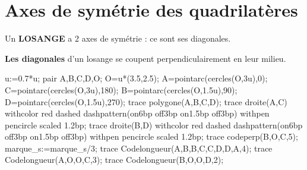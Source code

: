 \section{Axes de symétrie des quadrilatères}
\begin{minipage}{0.75\linewidth}
    \begin{propriete}[\admise]
        Un \textbf{LOSANGE} a 2 axes de symétrie : ce sont ses diagonales.
    \end{propriete}
    \begin{remarque}

        \textbf{Les diagonales} d'un losange se coupent perpendiculairement en leur milieu.
    \end{remarque}
\end{minipage}
\begin{minipage}{0.2\linewidth}
    \begin{center}
        \begin{Geometrie}[CoinHD={(4.9u,3.5u)}]
            u:=0.7*u;
            pair A,B,C,D,O;
            O=u*(3.5,2.5);
            A=pointarc(cercles(O,3u),0);
            C=pointarc(cercles(O,3u),180);
            B=pointarc(cercles(O,1.5u),90);
            D=pointarc(cercles(O,1.5u),270);
            trace polygone(A,B,C,D);
            trace droite(A,C) withcolor red dashed dashpattern(on6bp off3bp on1.5bp off3bp) withpen pencircle scaled 1.2bp;
            trace droite(B,D) withcolor red dashed dashpattern(on6bp off3bp on1.5bp off3bp) withpen pencircle scaled 1.2bp;
            trace codeperp(B,O,C,5);
            marque_s:=marque_s/3;
            trace Codelongueur(A,B,B,C,C,D,D,A,4);
            trace Codelongueur(A,O,O,C,3);
            trace Codelongueur(B,O,O,D,2);
        \end{Geometrie}
    \end{center}
\end{minipage}

